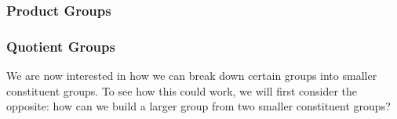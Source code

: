 


\subsubsection{Product Groups}





\subsubsection{Quotient Groups}
We are now interested in how we can break down certain groups into smaller constituent groups. To see how this could work, we will first consider the opposite: how can we build a larger group from two smaller constituent groups?


